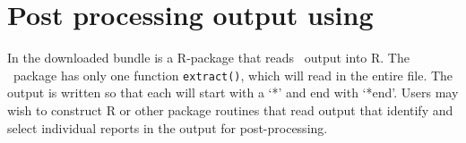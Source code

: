 \section{Post processing output using \R \label{sec:post-processing}}

In the downloaded bundle is a R-package that reads \CNAME\ output into R. The \CNAME\ package has only one function \texttt{extract()}, which will read in the entire file. The output is written so that each  will start with a `*' and end with `*end'. Users may wish to construct R or other package routines that read \CNAME output that  identify and select individual reports in the output for post-processing. 

